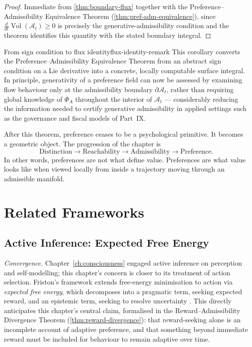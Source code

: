 \documentclass[12pt,twoside,openright]{book}
\newcommand{\Vol}{\operatorname{Vol}}
\begin{document}
\begin{proof}
  Immediate from \cref{thm:boundary-flux} together with the
  Preference--Admissibility Equivalence Theorem
  (\cref{thm:pref-adm-equivalence}), since
  $\frac{d}{dt}\Vol(\mathcal{A}_t) \ge 0$ is precisely the
  generative-admissibility condition and the theorem
  identifies this quantity with the stated boundary
  integral.
\end{proof}

\begin{remark}{From sign condition to flux identity}{flux-identity-remark}
  This corollary converts the Preference--Admissibility
  Equivalence Theorem from an abstract sign condition on a
  Lie derivative into a concrete, locally computable
  surface integral. In principle, generativity of a
  preference field can now be assessed by examining flow
  behaviour only at the admissibility boundary
  $\partial\mathcal{A}_t$, rather than requiring global
  knowledge of $\Phi_A$ throughout the interior of
  $\mathcal{A}_t$ --- considerably reducing the information
  needed to certify generative admissibility in applied
  settings such as the governance and fiscal models of
  Part~IX.
\end{remark}

After this theorem, preference ceases to be a psychological
primitive. It becomes a geometric object. The progression
of the chapter is
\[
  \text{Distinction} \to \text{Reachability}
  \to \text{Admissibility} \to \text{Preference}.
\]
In other words, preferences are not what define value.
Preferences are what value looks like when viewed locally
from inside a trajectory moving through an admissible
manifold.

\section{Related Frameworks}
\label{sec:ch22-related-frameworks}

\subsection*{Active Inference: Expected Free Energy}

\emph{Convergence.} Chapter~\ref{ch:consciousness} engaged
active inference on perception and self-modelling; this
chapter's concern is closer to its treatment of action
selection. Friston's framework extends free-energy minimisation
to action via \emph{expected free energy}, which decomposes into
a pragmatic term, seeking expected reward, and an epistemic
term, seeking to resolve uncertainty \parencite{friston2010}.
This directly anticipates this chapter's central claim, formalised
in the Reward--Admissibility Divergence Theorem
(\cref{thm:reward-divergence}): that reward-seeking alone is an
incomplete account of adaptive preference, and that something
beyond immediate reward must be included for behaviour to remain
adaptive over time.
\end{document}
